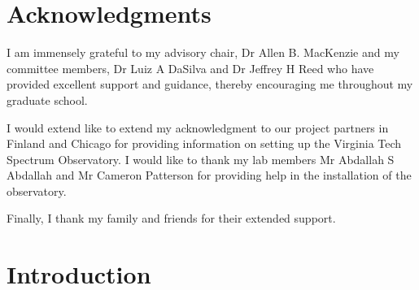 \documentclass[12pt,sts]{report}
\begin{document}

\tableofcontents

\pagebreak

\listoffigures
\pagebreak

\listoftables
\pagebreak

\section*{Acknowledgments}

I am immensely grateful to my advisory chair, Dr Allen B. MacKenzie and my committee members, Dr Luiz A DaSilva and Dr Jeffrey H Reed who have provided excellent support and guidance, thereby encouraging me throughout my graduate school.

I would extend like to extend my acknowledgment to our project partners in Finland and Chicago for providing information on setting up the Virginia Tech Spectrum Observatory. I would like to thank my lab members Mr Abdallah S Abdallah and Mr Cameron Patterson for providing help in the installation of the observatory.

Finally, I thank my family and friends for their extended support.
\pagebreak

\pagestyle{myheadings}

\renewcommand\thesection{\arabic{section}}

\section{Introduction}
\end{document}
